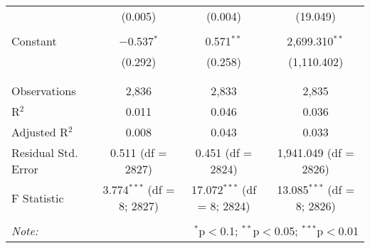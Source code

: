 \begin{table}[!htbp]
\begin{tabular}{@{\extracolsep{5pt}}lccc}
  & (0.005) & (0.004) & (19.049) \\ 
  & & & \\ 
 Constant & $-$0.537$^{*}$ & 0.571$^{**}$ & 2,699.310$^{**}$ \\ 
  & (0.292) & (0.258) & (1,110.402) \\ 
  & & & \\ 
\hline \\[-1.8ex] 
Observations & 2,836 & 2,833 & 2,835 \\ 
R$^{2}$ & 0.011 & 0.046 & 0.036 \\ 
Adjusted R$^{2}$ & 0.008 & 0.043 & 0.033 \\ 
Residual Std. Error & 0.511 (df = 2827) & 0.451 (df = 2824) & 1,941.049 (df = 2826) \\ 
F Statistic & 3.774$^{***}$ (df = 8; 2827) & 17.072$^{***}$ (df = 8; 2824) & 13.085$^{***}$ (df = 8; 2826) \\ 
\hline 
\hline \\[-1.8ex] 
\textit{Note:}  & \multicolumn{3}{r}{$^{*}$p$<$0.1; $^{**}$p$<$0.05; $^{***}$p$<$0.01} \\ 
\end{tabular} 
\end{table} 
